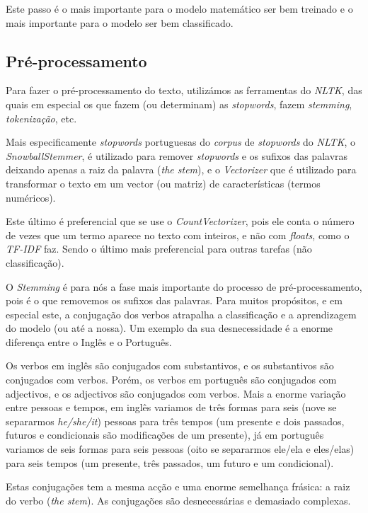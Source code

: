 Este passo é o mais importante para o modelo matemático ser bem treinado e o mais importante para o modelo ser bem classificado.

\subsection{Pré-processamento}

Para fazer o pré-processamento do texto, utilizámos as ferramentas do \textit{NLTK}, das quais em especial os que fazem (ou determinam) as \textit{stopwords}, fazem \textit{stemming}, \textit{tokenização}, etc.

Mais especificamente \textit{stopwords} portuguesas do \textit{corpus} de \textit{stopwords} do \textit{NLTK}, o \textit{SnowballStemmer}, é utilizado para remover \textit{stopwords} e os sufixos das palavras deixando apenas a raiz da palavra (\textit{the stem}), e o \textit{Vectorizer} que é utilizado para transformar o texto em um vector (ou matriz) de características (termos numéricos).

Este último é preferencial que se use o \textit{CountVectorizer}, pois ele conta o número de vezes que um termo aparece no texto com inteiros, e não com \textit{floats}, como o \textit{TF-IDF} faz. Sendo o último mais preferencial para outras tarefas (não classificação).

O \textit{Stemming} é para nós a fase mais importante do processo de pré-processamento, pois é o que removemos os sufixos das palavras.
Para muitos propósitos, e em especial este, a conjugação dos verbos atrapalha a classificação e a aprendizagem do modelo (ou até a nossa). Um exemplo da sua desnecessidade é a enorme diferença entre o Inglês e o Português.

Os verbos em inglês são conjugados com substantivos, e os substantivos são conjugados com verbos. Porém, os verbos em português são conjugados com adjectivos, e os adjectivos são conjugados com verbos. Mais a enorme variação entre pessoas e tempos, em inglês variamos de três formas para seis (nove se separarmos \textit{he/she/it}) pessoas para três tempos (um presente e dois passados, futuros e condicionais são modificações de um presente), já em português variamos de seis formas para seis pessoas (oito se separarmos ele/ela e eles/elas) para seis tempos (um presente, três passados, um futuro e um condicional).

Estas conjugações tem a mesma acção e uma enorme semelhança frásica: a raiz do verbo (\textit{the stem}). As conjugações são desnecessárias e demasiado complexas.


